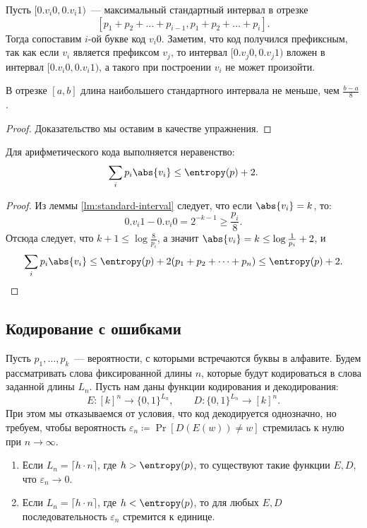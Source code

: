 Пусть $[0.v_i0, 0.v_i1)$~--- максимальный стандартный интервал в отрезке
$$
[p_1 + p_2 + \dots + p_{i - 1}, p_1 + p_2 + \dots + p_{i}].
$$ 
Тогда сопоставим $i$-ой букве код $v_i0$. Заметим, что код получился префиксным, так как если $v_i$
является префиксом $v_j$, то интервал $[0.v_j0, 0.v_j1)$ вложен в интервал $[0.v_i0, 0.v_i1)$, а такого
при построении $ v_i $ не может произойти.

\begin{lemma}
    \label{lm:standard-interval}
    В отрезке $[a, b]$ длина наибольшего стандартного интервала не меньше, чем $\frac{b - a}{8}$.
\end{lemma}
\begin{proof}
    Доказательство мы оставим в качестве упражнения.
\end{proof}

\begin{proposition}
    Для арифметического кода выполняется неравенство:
    $$
        \sum_i p_i\abs{v_i} \le \entropy(p) + 2.
    $$
\end{proposition}
\begin{proof}
    Из леммы \ref{lm:standard-interval} следует, что если $\abs{v_i} = k$, то:
    $$
    0.v_i1 - 0.v_i0 = 2^{-k-1}  \ge \frac {p_i}{8}.
    $$ 
    Отсюда следует, что ${k + 1} \le \log \frac{8}{p_i}$, а значит
    $\abs{v_i} = k \le \log\frac{1}{p_i} + 2$, и
    $$
        \sum_i p_i \abs{v_i} \le \entropy(p) + 2(p_1 + p_2 + \dots + p_n) \le \entropy(p) + 2.
    $$
\end{proof}


\subsection{Кодирование с ошибками}

Пусть $p_1, \dots, p_k $~--- вероятности, с которыми встречаются буквы в алфавите. Будем рассматривать
слова фиксированной длины $n$, которые будут кодироваться в слова заданной длины $L_n$. Пусть нам даны
функции кодирования и декодирования:
$$
    E\colon [k]^n \to \{0, 1\}^{L_n}, \qquad D\colon \{0, 1\}^{L_n} \to [k]^n.
$$
При этом мы отказываемся от условия, что код декодируется однозначно, но требуем, чтобы вероятность
$  
\varepsilon_n \coloneqq \Pr[D(E(w)) \ne w]$ стремилась к нулю при $n \to \infty$.

\begin{theorem}[Шеннон]
    \begin{enumerate}
        \item Если $ L_n = \lceil h\cdot n\rceil$, где $h > \entropy(p)$, то существуют такие функции $E,
            D$, что $\varepsilon_n \to 0$.
        \item Если $L_n = \lceil h \cdot n \rceil$, где $h < \entropy(p)$, то для любых $E, D$
            последовательность $\varepsilon_n$ стремится к единице.
    \end{enumerate}
\end{theorem}

